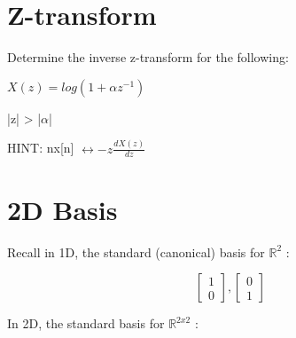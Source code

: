 \documentclass[11pt]{article}
\begin{document}
\section{Z-transform}

Determine the inverse z-transform for the following:

\begin{center}

\vspace{4mm}

$
X(z) = log( 1 + \alpha z^{-1})
$
\end{center}
|z| > |$\alpha$|

\vspace{3mm}

\begin{center}
HINT:  nx[n] $\longleftrightarrow -z \frac{dX(z)}{dz}$
\end{center}


\section{2D Basis}

Recall in 1D, the standard (canonical) basis for $\mathbb{R}^2$ :

\begin{center}
\[
\begin{bmatrix}
   1        \\
    0      
            
\end{bmatrix}
,
\begin{bmatrix}
      0        \\
    1      
\end{bmatrix}
\]
\end{center}

In 2D, the standard basis for $\mathbb{R}^{2x2}$ :
\end{document}
